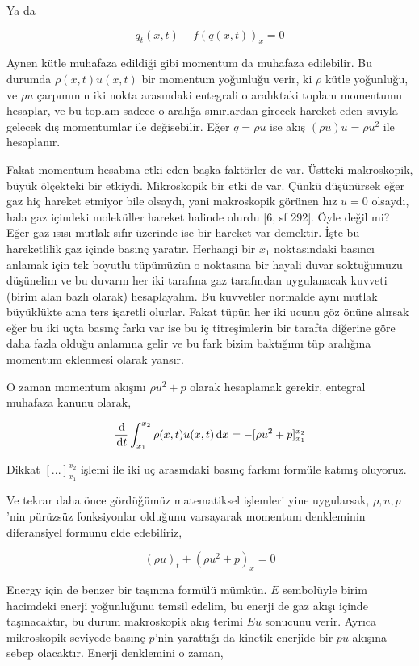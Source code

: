 \documentclass[12pt,fleqn]{article}\usepackage{../../common}
\begin{document}
Ya da

$$
q_t(x,t) + f(q(x,t))_x  = 0
$$

Aynen kütle muhafaza edildiği gibi momentum da muhafaza edilebilir. Bu durumda
$\rho(x,t) u(x,t)$ bir momentum yoğunluğu verir, ki $\rho$ kütle yoğunluğu, ve
$\rho u$ çarpımının iki nokta arasındaki entegrali o aralıktaki toplam momentumu
hesaplar, ve bu toplam sadece o aralığa sınırlardan girecek hareket eden sıvıyla
gelecek dış momentumlar ile değisebilir. Eğer $q = \rho u$ ise akış
$(\rho u) u = \rho u^2$ ile hesaplanır.

Fakat momentum hesabına etki eden başka faktörler de var. Üstteki makroskopik,
büyük ölçekteki bir etkiydi. Mikroskopik bir etki de var. Çünkü düşünürsek eğer
gaz hiç hareket etmiyor bile olsaydı, yani makroskopik görünen hız $u=0$
olsaydı, hala gaz içindeki moleküller hareket halinde olurdu [6, sf 292]. Öyle
değil mi?  Eğer gaz ısısı mutlak sıfır üzerinde ise bir hareket var
demektir. İşte bu hareketlilik gaz içinde basınç yaratır. Herhangi bir $x_1$
noktasındaki basıncı anlamak için tek boyutlu tüpümüzün o noktasına bir hayali
duvar soktuğumuzu düşünelim ve bu duvarın her iki tarafına gaz tarafından
uygulanacak kuvveti (birim alan bazlı olarak) hesaplayalım. Bu kuvvetler
normalde aynı mutlak büyüklükte ama ters işaretli olurlar. Fakat tüpün her
iki ucunu göz önüne alırsak eğer bu iki uçta basınç farkı var ise bu
iç titreşimlerin bir tarafta diğerine göre daha fazla olduğu anlamına gelir
ve bu fark bizim baktığımı tüp aralığına momentum eklenmesi olarak yansır.

O zaman momentum akışını $\rho u^2 + p$ olarak hesaplamak gerekir, entegral
muhafaza kanunu olarak,

$$
\frac{\,\mathrm{d}}{\,\mathrm{d} t} \int _{x_1}^{x_2} 
\rho(x,t) u(x,t) \,\mathrm{d} x = - [\rho u^2 + p] _{x_1}^{x_2}
$$

Dikkat $[ ... ]_{x_1}^{x_2}$ işlemi ile iki uç arasındaki basınç farkını
formüle katmış oluyoruz.

Ve tekrar daha önce gördüğümüz matematiksel işlemleri yine uygularsak,
$\rho,u,p$'nin pürüzsüz fonksiyonlar olduğunu varsayarak momentum denkleminin
diferansiyel formunu elde edebiliriz,

$$
(\rho u)_t + (\rho u^2 + p)_x = 0
$$

Energy için de benzer bir taşınma formülü mümkün. $E$ sembolüyle birim hacimdeki
enerji yoğunluğunu temsil edelim, bu enerji de gaz akışı içinde taşınacaktır, bu
durum makroskopik akış terimi $E u$ sonucunu verir. Ayrıca mikroskopik seviyede
basınç $p$'nin yarattığı da kinetik enerjide bir $pu$ akışına sebep olacaktır.
Enerji denklemini o zaman,
\end{document}
